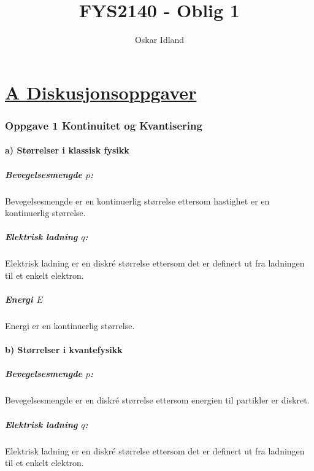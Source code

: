 \documentclass{article}
\author{Oskar Idland}
\title{FYS2140 - Oblig 1}
\date{}
\begin{document}
\maketitle
\newpage
\part*{\underline{A Diskusjonsoppgaver}}
\section*{Oppgave 1 Kontinuitet og Kvantisering}
\subsection*{a) Størrelser i klassisk fysikk}
\subsubsection*{\textbf{Bevegelsesmengde $p$:}}
Bevegelsesmengde er en kontinuerlig størrelse ettersom hastighet er en kontinuerlig størrelse. 

\subsubsection*{\textbf{Elektrisk ladning $q$:}}
Elektrisk ladning er en diskré størrelse ettersom det er definert ut fra ladningen til et enkelt elektron. 

\subsubsection*{\textbf{Energi $E$}}
Energi er en kontinuerlig størrelse. 

\subsection*{b) Størrelser i kvantefysikk}  
\subsubsection*{\textbf{Bevegelsesmengde $p$:}}
Bevegelsesmengde er en diskré størrelse ettersom energien til partikler er diskret.

\subsubsection*{\textbf{Elektrisk ladning $q$:}}
Elektrisk ladning er en diskré størrelse ettersom det er definert ut fra ladningen til et enkelt elektron. 
\end{document}
